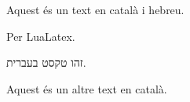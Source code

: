 \documentclass[12pt]{article}
\begin{document}
Aquest és un text en català i hebreu.

Per LuaLatex.

\begin{otherlanguage}{hebrew}
זהו טקסט בעברית.
\end{otherlanguage}

Aquest és un altre text en català.
\end{document}
